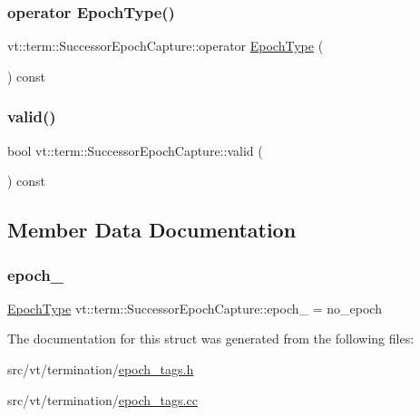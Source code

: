 \subsubsection{\texorpdfstring{operator Epoch\+Type()}{operator EpochType()}}
{\footnotesize\ttfamily vt\+::term\+::\+Successor\+Epoch\+Capture\+::operator \hyperlink{namespacevt_a985a5adf291c34a3ca263b3378388236}{Epoch\+Type} (\begin{DoxyParamCaption}{ }\end{DoxyParamCaption}) const\hspace{0.3cm}{\ttfamily [inline]}}

\mbox{\label{structvt_1_1term_1_1_successor_epoch_capture_ad21502111c09b6e08e9bd1200428f53e}} 
\subsubsection{\texorpdfstring{valid()}{valid()}}
{\footnotesize\ttfamily bool vt\+::term\+::\+Successor\+Epoch\+Capture\+::valid (\begin{DoxyParamCaption}{ }\end{DoxyParamCaption}) const\hspace{0.3cm}{\ttfamily [inline]}}



\subsection{Member Data Documentation}
\mbox{\label{structvt_1_1term_1_1_successor_epoch_capture_a05fadad7e140439c90905b2cdd5e265e}} 
\subsubsection{\texorpdfstring{epoch\+\_\+}{epoch\_}}
{\footnotesize\ttfamily \hyperlink{namespacevt_a985a5adf291c34a3ca263b3378388236}{Epoch\+Type} vt\+::term\+::\+Successor\+Epoch\+Capture\+::epoch\+\_\+ = no\+\_\+epoch\hspace{0.3cm}{\ttfamily [private]}}



The documentation for this struct was generated from the following files\+:\begin{DoxyCompactItemize}
\item 
src/vt/termination/\hyperlink{epoch__tags_8h}{epoch\+\_\+tags.\+h}\item 
src/vt/termination/\hyperlink{epoch__tags_8cc}{epoch\+\_\+tags.\+cc}\end{DoxyCompactItemize}
